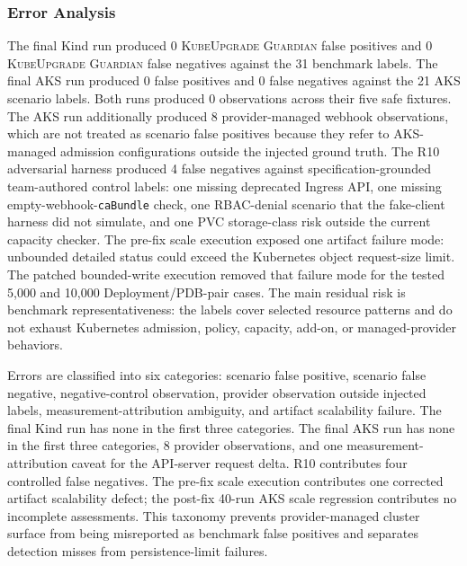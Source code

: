 \documentclass[10pt,journal]{IEEEtran}
\newcommand{\tool}{\textsc{KubeUpgrade Guardian}}
\newcommand{\code}[1]{\texttt{#1}}
\begin{document}
\subsubsection*{Error Analysis}
The final Kind run produced 0 \tool{} false positives and 0 \tool{} false negatives against the 31 benchmark labels. The final AKS run produced 0 false positives and 0 false negatives against the 21 AKS scenario labels. Both runs produced 0 observations across their five safe fixtures. The AKS run additionally produced 8 provider-managed webhook observations, which are not treated as scenario false positives because they refer to AKS-managed admission configurations outside the injected ground truth. The R10 adversarial harness produced 4 false negatives against specification-grounded team-authored control labels: one missing deprecated Ingress API, one missing empty-webhook-\code{caBundle} check, one RBAC-denial scenario that the fake-client harness did not simulate, and one PVC storage-class risk outside the current capacity checker. The pre-fix scale execution exposed one artifact failure mode: unbounded detailed status could exceed the Kubernetes object request-size limit. The patched bounded-write execution removed that failure mode for the tested 5,000 and 10,000 Deployment/PDB-pair cases. The main residual risk is benchmark representativeness: the labels cover selected resource patterns and do not exhaust Kubernetes admission, policy, capacity, add-on, or managed-provider behaviors.

Errors are classified into six categories: scenario false positive, scenario false negative, negative-control observation, provider observation outside injected labels, measurement-attribution ambiguity, and artifact scalability failure. The final Kind run has none in the first three categories. The final AKS run has none in the first three categories, 8 provider observations, and one measurement-attribution caveat for the API-server request delta. R10 contributes four controlled false negatives. The pre-fix scale execution contributes one corrected artifact scalability defect; the post-fix 40-run AKS scale regression contributes no incomplete assessments. This taxonomy prevents provider-managed cluster surface from being misreported as benchmark false positives and separates detection misses from persistence-limit failures.
\end{document}
